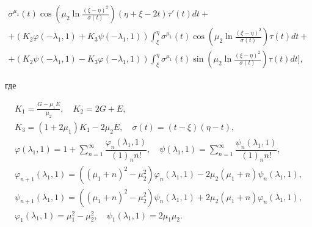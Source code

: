 \begin{multline}
\sigma^{\mu_1}(t)

\cos \left(

    \mu_2 \ln \frac{(\xi-\eta)^2}{\sigma(t)}

  \right)

(\eta+\xi-2t)

\tau'(t)dt+

\\

+ \left( 

K_2\varphi(-\lambda_1,1)+

K_3\psi(-\lambda_1,1)

\right)

\int_{\xi}^{\eta}

\sigma^{\mu_1}(t)

\cos \left(

    \mu_2 \ln \frac{(\xi-\eta)^2}{\sigma(t)}

  \right)

\tau(t)dt+

\\

+\left(

 K_2\psi(-\lambda_1,1)-

K_3\varphi(-\lambda_1,1)

\right)

\int_{\xi}^{\eta}

\sigma^{\mu_1}(t)

\sin \left(

    \mu_2 \ln \frac{(\xi-\eta)^2}{\sigma(t)}

  \right)

\tau(t)dt

\bigg],

\end{multline}

где

\begin{gather*}

K_1=\frac{G-\mu_1 E}{\mu_2},\quad K_2=2G+E, \\

K_3=(1+2\mu_1)K_1-2\mu_2 E, \quad  \sigma(t)=(t-\xi)(\eta-t), \\

\varphi(\lambda_1,1)=1+\sum\limits_{n=1}^{\infty} \dfrac{\varphi_n(\lambda_1,1)}{(1)_n n!}, \quad  \psi(\lambda_1,1)=\sum\limits_{n=1}^{\infty} \dfrac{\psi_n(\lambda_1,1)}{(1)_n n!},

\\

\varphi_{n+1}(\lambda_1,1)=((\mu_1+n)^2-\mu_2^2)\varphi_{n}(\lambda_1,1)-2\mu_2(\mu_1+n)\psi_n(\lambda_1,1), 

\\

\psi_{n+1}(\lambda_1,1)=((\mu_1+n)^2-\mu_2^2)\psi_{n}(\lambda_1,1)+2\mu_2(\mu_1+n)\varphi_n(\lambda_1,1),

\\

\varphi_1(\lambda_1,1)=\mu_1^2-\mu_2^2,\quad  \psi_1(\lambda_1,1)=2 \mu_1 \mu_2.

\end{gather*}



